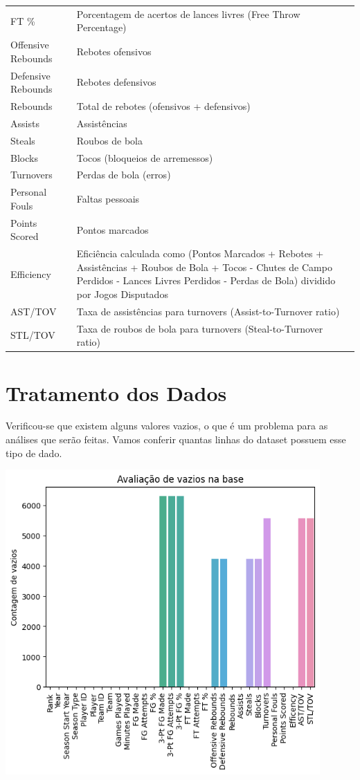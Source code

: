 \documentclass[
]{book}
\begin{document}
\begin{longtable}[]{@{}
  >{\raggedright\arraybackslash}p{}
  >{\raggedright\arraybackslash}p{}@{}}
FT \% & Porcentagem de acertos de lances livres (Free Throw Percentage) \\
Offensive Rebounds & Rebotes ofensivos \\
Defensive Rebounds & Rebotes defensivos \\
Rebounds & Total de rebotes (ofensivos + defensivos) \\
Assists & Assistências \\
Steals & Roubos de bola \\
Blocks & Tocos (bloqueios de arremessos) \\
Turnovers & Perdas de bola (erros) \\
Personal Fouls & Faltas pessoais \\
Points Scored & Pontos marcados \\
Efficiency & Eficiência calculada como (Pontos Marcados + Rebotes + Assistências + Roubos de Bola + Tocos - Chutes de Campo Perdidos - Lances Livres Perdidos - Perdas de Bola) dividido por Jogos Disputados \\
AST/TOV & Taxa de assistências para turnovers (Assist-to-Turnover ratio) \\
STL/TOV & Taxa de roubos de bola para turnovers (Steal-to-Turnover ratio) \\
\bottomrule()
\end{longtable}

\hypertarget{tratamento-dos-dados}{%
\chapter{Tratamento dos Dados}\label{tratamento-dos-dados}}

Verificou-se que existem alguns valores vazios, o que é um problema para as análises que serão feitas. Vamos conferir quantas linhas do dataset possuem esse tipo de dado.

\includegraphics[width=0.9\textwidth,height=\textheight]{imagens/1.png}
\end{document}
